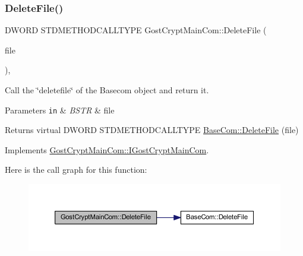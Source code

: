 \subsubsection{\texorpdfstring{Delete\+File()}{DeleteFile()}}
{\footnotesize\ttfamily D\+W\+O\+RD S\+T\+D\+M\+E\+T\+H\+O\+D\+C\+A\+L\+L\+T\+Y\+PE Gost\+Crypt\+Main\+Com\+::\+Delete\+File (\begin{DoxyParamCaption}\item[{B\+S\+TR}]{file }\end{DoxyParamCaption})\hspace{0.3cm}{\ttfamily [inline]}, {\ttfamily [virtual]}}



Call the \char`\"{}deletefile\char`\"{} of the Basecom object and return it. 


\begin{DoxyParams}[1]{Parameters}
\mbox{\tt in}  & {\em B\+S\+TR} & file \\
\hline
\end{DoxyParams}
\begin{DoxyReturn}{Returns}
virtual D\+W\+O\+RD S\+T\+D\+M\+E\+T\+H\+O\+D\+C\+A\+L\+L\+T\+Y\+PE \hyperlink{class_base_com_a52133219ed5ad54607a6c417de0ba666}{Base\+Com\+::\+Delete\+File} (file) 
\end{DoxyReturn}


Implements \hyperlink{interface_gost_crypt_main_com_1_1_i_gost_crypt_main_com}{Gost\+Crypt\+Main\+Com\+::\+I\+Gost\+Crypt\+Main\+Com}.

Here is the call graph for this function\+:
\nopagebreak
\begin{figure}[H]
\begin{center}
\leavevmode
\includegraphics[width=350pt]{class_gost_crypt_main_com_aaad0924cbc040f56ef0dfeb7f1998be0_cgraph}
\end{center}
\end{figure}
\mbox{\label{class_gost_crypt_main_com_afd2c6c9964abf54b5eed75e2fda9ce7b}} 
